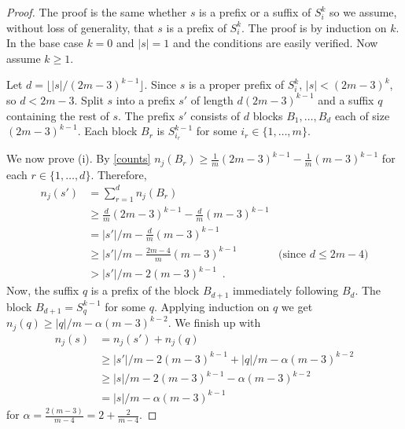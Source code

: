 \documentclass[kpfonts]{patmorin}
\begin{document}
\begin{proof}
    The proof is the same whether $s$ is a prefix or a suffix of $S_i^k$ so we assume, without loss of generality, that $s$ is a prefix of $S_i^k$. The proof is by induction on $k$.  In the base case $k=0$ and $|s|=1$ and the conditions are easily verified. Now assume $k\ge 1$.

    Let $d=\lfloor |s|/(2m-3)^{k-1}\rfloor$.  Since $s$ is a proper prefix of $S_i^k$, $|s|< (2m-3)^k$, so $d < 2m-3$. Split $s$ into a prefix $s'$ of length $d(2m-3)^{k-1}$ and a suffix $q$ containing the rest of $s$.
    The prefix $s'$ consists of $d$ blocks $B_1,\ldots,B_{d}$ each of size $(2m-3)^{k-1}$.  Each block $B_r$ is $S_{i_r}^{k-1}$ for some $i_r\in\{1,\ldots,m\}$.

    We now prove (i).  By \cref{counts} $n_j(B_r)\ge \tfrac{1}{m}(2m-3)^{k-1} - \tfrac{1}{m}(m-3)^{k-1}$ for each $r\in\{1,\ldots,d\}$.  Therefore,
    \begin{align*}
        n_j(s') & = \sum_{r=1}^d n_j(B_r) \\
        & \ge  \tfrac{d}{m}(2m-3)^{k-1} - \tfrac{d}{m}(m-3)^{k-1} \\
        & = |s'|/m - \tfrac{d}{m}(m-3)^{k-1} \\
        & \ge |s'|/m - \tfrac{2m-4}{m}(m-3)^{k-1} & \text{(since $d\le 2m-4$)}\\
        & > |s'|/m - 2(m-3)^{k-1} \enspace .
    \end{align*}
    Now, the suffix $q$ is a prefix of the block $B_{d+1}$ immediately following $B_d$.  The block $B_{d+1}=S_{q}^{k-1}$ for some $q$.
    Applying induction on $q$ we get $n_j(q) \ge |q|/m - \alpha(m-3)^{k-2}$.  We finish up with
    \begin{align*}
        n_j(s) & = n_j(s') + n_j(q) \\
        & \ge |s'|/m - 2(m-3)^{k-1} + |q|/m - \alpha(m-3)^{k-2} \\
        & \ge |s|/m - 2(m-3)^{k-1} - \alpha(m-3)^{k-2} \\
        & = |s|/m - \alpha(m-3)^{k-1}
    \end{align*}
    for $\alpha = \tfrac{2(m-3)}{m-4}=2+\tfrac{2}{m-4}$.


\end{proof}
\end{document}
